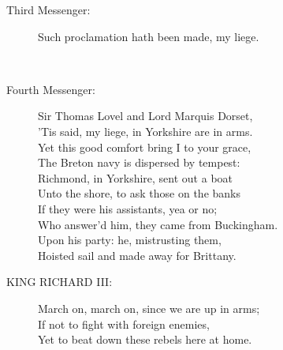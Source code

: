 \documentclass{article}
\begin{document}
\begin{description}
\item[Third Messenger:] 
\hspace{1pt}Such proclamation hath been made, my liege.\\
\end{description}
\\
\begin{description}
\item[Fourth Messenger:] 
\hspace{1pt}Sir Thomas Lovel and Lord Marquis Dorset,\\
\hspace{1pt}'Tis said, my liege, in Yorkshire are in arms.\\
\hspace{1pt}Yet this good comfort bring I to your grace,\\
\hspace{1pt}The Breton navy is dispersed by tempest:\\
\hspace{1pt}Richmond, in Yorkshire, sent out a boat\\
\hspace{1pt}Unto the shore, to ask those on the banks\\
\hspace{1pt}If they were his assistants, yea or no;\\
\hspace{1pt}Who answer'd him, they came from Buckingham.\\
\hspace{1pt}Upon his party: he, mistrusting them,\\
\hspace{1pt}Hoisted sail and made away for Brittany.\\
\end{description}
\begin{description}
\item[KING RICHARD III:] 
\hspace{1pt}March on, march on, since we are up in arms;\\
\hspace{1pt}If not to fight with foreign enemies,\\
\hspace{1pt}Yet to beat down these rebels here at home.\\
\end{description}
\\
\end{document}
